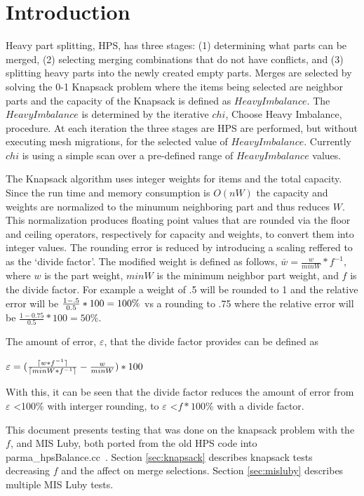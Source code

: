 \documentclass[a4paper]{article}
\DeclarePairedDelimiter{\ceil}{\lceil}{\rceil}
\begin{document}
\section{Introduction}

Heavy part splitting, HPS, has three stages: (1) determining what parts can be merged, (2) selecting merging combinations that do not have conflicts, and (3) splitting heavy parts into the newly created empty parts.  Merges are selected by solving the 0-1 Knapsack problem where the items being selected are neighbor parts and the capacity of the Knapsack is defined as $HeavyImbalance$.  The $HeavyImbalance$ is determined by the iterative $chi$, Choose Heavy Imbalance, procedure.  At each iteration the three stages are HPS are performed, but without executing mesh migrations, for the selected value of $HeavyImbalance$.  Currently $chi$ is using a simple scan over a pre-defined range of $HeavyImbalance$ values.  

The Knapsack algorithm uses integer weights for items and the total capacity.  
Since the run time and memory consumption is $O(nW)$ the capacity and weights are normalized to the minumum neighboring part and thus reduces $W$.  
This normalization produces floating point values that are rounded via the floor and ceiling operators, respectively for capacity and weights, to convert them into integer values.  The rounding error is reduced by introducing a scaling reffered to as the `divide factor'.  
The modified weight is defined as follows, $\bar{w} = \frac{w}{minW}*f^{-1}$, where $w$ is the part weight, $minW$ is the minimum neighbor part weight, and $f$ is the divide factor.
For example a weight of .5 will be rounded to 1 and the relative error will be $\centering \frac{1-.5}{0.5}*100 = 100\%$ vs a rounding to .75 where the relative error will be $\frac{1-0.75}{0.5}*100 = 50\%$. 

The amount of error, $\varepsilon$, that the divide factor provides can be defined as \begin{center} $ \varepsilon = (\frac{\ceil{w*f^{-1}}}{\ceil{minW*f^{-1}}} - \frac{w}{minW})*100$ \end{center} 

With this, it can be seen that the divide factor reduces the amount of error from $\varepsilon$ \textless100\% with interger rounding, to $\varepsilon$ \textless$f*100$\% with a divide factor. 


This document presents testing that was done on the knapsack problem with the $f$, and MIS Luby, both ported from the old HPS code into parma\_hpsBalance.cc~\cite{scorecGH}. 
Section \ref{sec:knapsack} describes knapsack tests decreasing $f$ and the affect on merge selections. Section \ref{sec:misluby} describes multiple MIS Luby tests.
\end{document}
